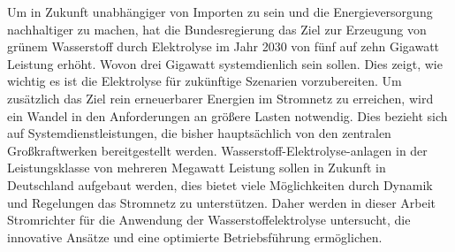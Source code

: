 Um in Zukunft unabhängiger von Importen zu sein und die Energieversorgung nachhaltiger zu machen, hat die Bundesregierung das Ziel zur Erzeugung von grünem Wasserstoff durch Elektrolyse im Jahr 2030 von fünf auf zehn Gigawatt Leistung erhöht. Wovon drei Gigawatt systemdienlich sein sollen. Dies zeigt, wie wichtig es ist die Elektrolyse für zukünftige Szenarien vorzubereiten.
Um zusätzlich das Ziel rein erneuerbarer Energien im Stromnetz zu erreichen, wird ein Wandel in den Anforderungen an größere Lasten notwendig. Dies bezieht sich auf Systemdienstleistungen, die bisher hauptsächlich von den zentralen Großkraftwerken bereitgestellt werden. Wasserstoff-Elektrolyse-anlagen in der Leistungsklasse von mehreren Megawatt Leistung sollen in Zukunft in Deutschland aufgebaut werden, dies bietet viele Möglichkeiten durch Dynamik und Regelungen das Stromnetz zu unterstützen. Daher werden in dieser Arbeit Stromrichter für die Anwendung der Wasserstoffelektrolyse untersucht, die innovative Ansätze und eine optimierte Betriebsführung ermöglichen. 
